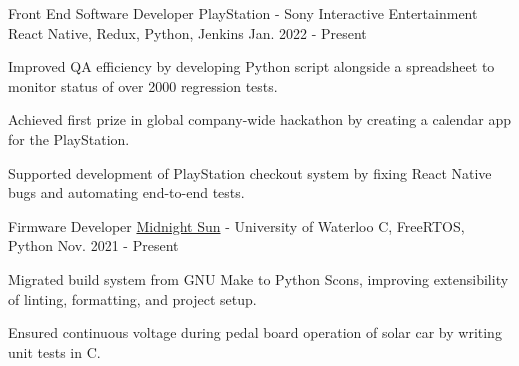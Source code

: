 

\begin{cventries}


  \cventry
    {Front End Software Developer} %
    {PlayStation - Sony Interactive Entertainment} %
    {React Native, Redux, Python, Jenkins} %
    {Jan. 2022 - Present} %
    {
      \begin{cvitems} %
        \item {Improved QA efficiency by developing Python script alongside a spreadsheet to monitor status of over 2000 regression tests. } 
        \item {Achieved first prize in global company-wide hackathon by creating a calendar app for the PlayStation. }
        \item {Supported development of PlayStation checkout system by fixing React Native bugs and automating end-to-end tests.}
      \end{cvitems}
    }


  \cventry
    {Firmware Developer} %
    {\href{https://www.uwmidsun.com/}{Midnight Sun} - University of Waterloo} %
    {C, FreeRTOS, Python} %
    {Nov. 2021 - Present} %
    {
      \begin{cvitems} %
        \item {Migrated build system from GNU Make to Python Scons, improving extensibility of linting, formatting, and project setup.}
        \item {Ensured continuous voltage during pedal board operation of solar car by writing unit tests in C.}
      \end{cvitems}
    }


\end{cventries}

